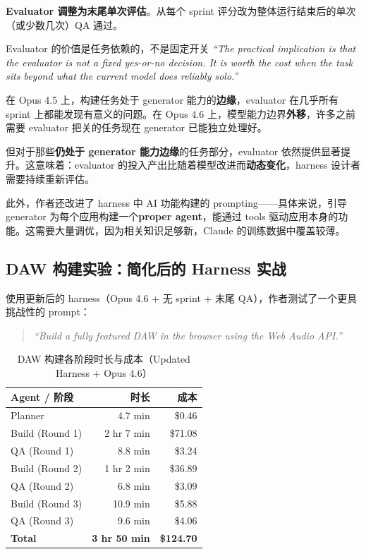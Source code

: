\documentclass[a4paper]{article}
\begin{document}
\textbf{Evaluator 调整为末尾单次评估}。从每个 sprint 评分改为整体运行结束后的单次（或少数几次）QA 通过。

\begin{warningbox}{Evaluator 的价值是任务依赖的，不是固定开关}
\textit{``The practical implication is that the evaluator is not a fixed yes-or-no decision. It is worth the cost when the task sits beyond what the current model does reliably solo.''}

在 Opus 4.5 上，构建任务处于 generator 能力的\textbf{边缘}，evaluator 在几乎所有 sprint 上都能发现有意义的问题。在 Opus 4.6 上，模型能力边界\textbf{外移}，许多之前需要 evaluator 把关的任务现在 generator 已能独立处理好。

但对于那些\textbf{仍处于 generator 能力边缘}的任务部分，evaluator 依然提供显著提升。这意味着：evaluator 的投入产出比随着模型改进而\textbf{动态变化}，harness 设计者需要持续重新评估。
\end{warningbox}

此外，作者还改进了 harness 中 AI 功能构建的 prompting——具体来说，引导 generator 为每个应用构建一个\textbf{proper agent}，能通过 tools 驱动应用本身的功能。这需要大量调优，因为相关知识足够新，Claude 的训练数据中覆盖较薄。

\subsection{DAW 构建实验：简化后的 Harness 实战}

使用更新后的 harness（Opus 4.6 + 无 sprint + 末尾 QA），作者测试了一个更具挑战性的 prompt：

\begin{quote}
\textit{``Build a fully featured DAW in the browser using the Web Audio API.''}
\end{quote}

\begin{table}[H]
\centering
\renewcommand{\arraystretch}{1.3}
\begin{tabular}{lrr}
\toprule
\textbf{Agent / 阶段} & \textbf{时长} & \textbf{成本} \\
\midrule
Planner & 4.7 min & \$0.46 \\
Build (Round 1) & 2 hr 7 min & \$71.08 \\
QA (Round 1) & 8.8 min & \$3.24 \\
Build (Round 2) & 1 hr 2 min & \$36.89 \\
QA (Round 2) & 6.8 min & \$3.09 \\
Build (Round 3) & 10.9 min & \$5.88 \\
QA (Round 3) & 9.6 min & \$4.06 \\
\midrule
\textbf{Total} & \textbf{3 hr 50 min} & \textbf{\$124.70} \\
\bottomrule
\end{tabular}
\caption{DAW 构建各阶段时长与成本（Updated Harness + Opus 4.6）}
\end{table}
\end{document}
